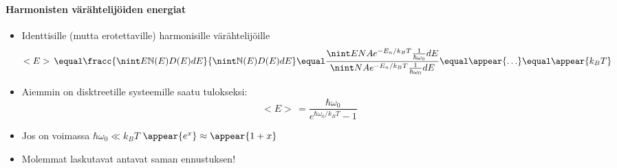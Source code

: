 \begin{frame}
\frametitle{\texorpdfstring{\culine[\sectiontitleulinecolor]{\sectiontitle}}{\sectiontitle} }
\framesubtitle{Harmonisten värähtelijöiden energiat}
\appear{}
\begin{itemize}
	\item Identtisille (mutta erotettaville) harmonisille värähtelijöille
\[ 
  < E >\,  \equal \fracc{\nint E \mathbb{N}(E) D(E) d E}{\nint \mathbb{N}(E) D(E) d E}  \equal \frac{\nint E N A e^{-E_{n} / k_{B} T} \frac{1}{\hbar \omega_{0}} d E}{\nint N A e^{-E_{n} / k_{B} T} \frac{1}{\hbar \omega_{0}} d E}  \equal \appear{\ldots} \equal \appear{k_{B} T} 
 \]
\item Aiemmin on disktreetille systeemille saatu tulokseksi:
\[ 
  < E >\,  \equal \frac{\hbar \omega_{0}}{e^{\hbar \omega_{0} / k_{B} T}-1} 
 \]
\item Jos on voimassa $\hbar \omega_{0} \ll k_{B} T$ $\appear{e^{x}} \approx \appear{1+x}$

\item Molemmat laskutavat antavat saman ennustuksen!
\end{itemize}

\endofsection
\end{frame}

